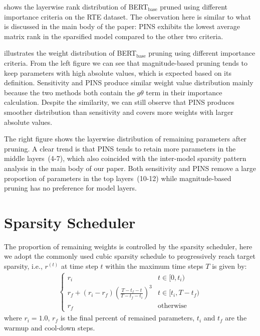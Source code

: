  shows the layerwise rank distribution of BERT$_{\text{base}}$ pruned using different importance criteria on the RTE dataset. The observation here is similar to what is discussed in the main body of the paper: PINS exhibits the lowest average matrix rank in the sparsified model compared to the other two criteria.

 illustrates the weight distribution of BERT$_{\text{base}}$ pruning using different importance criteria. From the left figure we can see that magnitude-based pruning tends to keep parameters with high absolute values, which is expected based on its definition. Sensitivity and PINS produce similar weight value distribution mainly because the two methods both contain the $g\theta$ term in their importance calculation. Despite the similarity, we can still observe that PINS produces smoother distribution than sensitivity and covers more weights with larger absolute values. 


The right figure shows the layerwise distribution of remaining parameters after pruning. A clear trend is that PINS tends to retain more parameters in the middle layers~(4-7), which also coincided with the inter-model sparsity pattern analysis in the main body of our paper. Both sensitivity and PINS remove a large proportion of parameters in the top layers~(10-12) while magnitude-based pruning has no preference for model layers.




\section{Sparsity Scheduler}
The proportion of remaining weights is controlled by the sparsity scheduler, here  we adopt the commonly used  cubic sparsity schedule to progressively reach target sparsity, i.e., $r^{(t)}$ at time step $t$ within the maximum time steps $T$ is given by:
\begin{align}
	\begin{cases} 
		r_i & t\in [0, t_i) \\
		r_f+(r_i-r_f)(\frac{T-t_{f}-t}{T-t_f-t_i})^3 & t\in[t_i, T-t_f) \\
		r_f  & \text{otherwise}  
	\end{cases}
\end{align}
\label{eq:prune}
where $r_i=1.0$, $r_f$ is the final percent of remained parameters, $t_i$ and $t_f$ are the warmup and cool-down steps.

